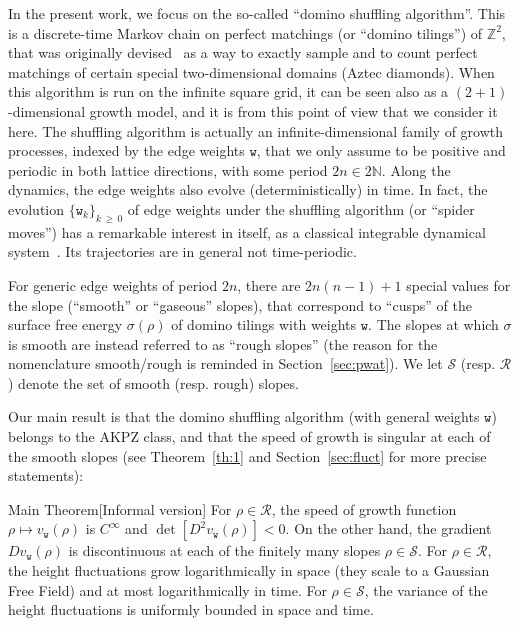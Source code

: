 \documentclass[10pt]{amsart}
\theoremstyle{definition}\newtheorem{defi}[theo]{Definition}\newtheorem{rema}[theo]{Remark}\newtheorem{exam}[theo]{Example}\newtheorem{exem}[theo]{Example}\newtheorem{nota}[theo]{Notation}
\newcommand{\ttw}{\mathtt{w}}
\newcommand{\bbZ}{\mathbb{Z}}
\newcommand{\bbN}{\mathbb{N}}
\newcommand{\clS}{\mathcal{S}}
\newcommand{\clR}{\mathcal{R}}
\begin{document}
In the present work, we focus on the so-called ``domino shuffling algorithm''. This is a discrete-time Markov chain on perfect matchings (or ``domino tilings'') of $\bbZ^2$, that was originally devised~\cite{EKLP92,EKLP92b,Pro03} as a way to exactly sample and to count perfect matchings of certain special two-dimensional domains (Aztec diamonds). When this algorithm is run on the infinite square grid, it can be seen also as a $(2+1)$-dimensional growth model, and it is from this point of view that we consider it here. The shuffling algorithm is actually an infinite-dimensional family of growth processes, indexed by the edge weights $\ttw$, that we only assume to be positive and periodic in both lattice directions, with some period $2n\in 2\bbN$. Along the dynamics, the edge weights also evolve (deterministically) in time. In fact, the evolution $\{\ttw_k\}_{k\,\ge\,0}$ of edge weights under the shuffling algorithm (or ``spider moves'') has a remarkable interest in itself, as a classical integrable dynamical system~\cite{GK13}. Its trajectories are in general not time-periodic.

For generic edge weights of period $2n$, there are $2n(n-1)+1$ special values for the slope (``smooth'' or ``gaseous'' slopes), that correspond to ``cusps'' of the surface free energy $\sigma(\rho)$ of domino tilings with weights $\ttw$. The slopes at which $\sigma$ is smooth are instead referred to as ``rough slopes'' (the reason for the nomenclature smooth/rough is reminded in Section~\ref{sec:pwat}). We let $\clS$ (resp. $\clR$) denote the set of smooth (resp. rough) slopes.

Our main result is that the domino shuffling algorithm (with general weights $\ttw$) belongs to the AKPZ class, and that the speed of growth is singular at each of the smooth slopes (see Theorem~\ref{th:1} and Section~\ref{sec:fluct} for more precise statements):

\begin{enonce*}[plain]{Main Theorem}[Informal version]
For $\rho\in\clR$, the speed of growth function $\rho\mapsto v_{\ttw}(\rho)$ is $C^\infty$ and $\det[D^2v_{\ttw}(\rho)]<0$. On the other hand, the gradient $D v_{\ttw}(\rho)$ is discontinuous at each of the finitely many slopes $\rho\in\clS$. For $\rho\in \clR$, the height fluctuations grow logarithmically in space (they scale to a Gaussian Free Field) and at most logarithmically in time. For $\rho\in \clS$, the variance of the height fluctuations is uniformly bounded in space and time.
\end{enonce*}
\end{document}
